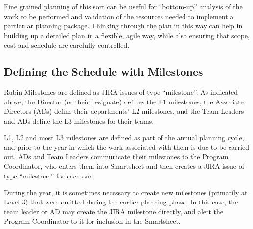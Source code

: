 Fine grained planning of this sort can be useful for ``bottom-up''
analysis of the work to be performed and validation of the resources
needed to implement a particular planning package. Thinking through the
plan in this way can help in building up a detailed plan in a flexible,
agile way, while also ensuring that scope, cost and schedule are
carefully controlled.


\subsection{Defining the Schedule with Milestones}

Rubin Milestones are defined as \gls{JIRA} issues of type ``milestone''. As indicated above, the \gls{Director} (or their designate) defines the L1 milestones, the Associate Directors (ADs) define their departments' \gls{L2} milestones, and the Team Leaders and ADs define the \gls{L3} milestones for their teams.

L1, \gls{L2} and most \gls{L3} milestones are defined as part of the annual planning \gls{cycle}, and prior to the year in which the work associated with them is due to be carried out. ADs and Team Leaders communicate their milestones to the Program Coordinator, who enters them into Smartsheet and then creates a \gls{JIRA} issue of type ``milestone'' for each one.

During the year, it is sometimes necessary to create new milestones (primarily at Level 3) that were omitted during the earlier planning phase. In this case, the team leader or \gls{AD} may create the \gls{JIRA} milestone directly, and alert the Program Coordinator to it for inclusion in the Smartsheet.

